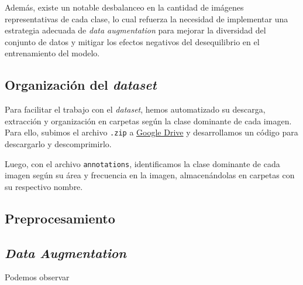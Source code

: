 \quad

\noindent
Además, existe un notable desbalanceo en la cantidad de imágenes representativas de cada clase, lo cual refuerza la necesidad de implementar una estrategia adecuada de 
\textit{data augmentation} para mejorar la diversidad del conjunto de datos y mitigar los efectos negativos del desequilibrio en el entrenamiento del modelo.

\subsection{Organización del \textit{dataset}}

\noindent
Para facilitar el trabajo con el \textit{dataset}, hemos automatizado su descarga, extracción y organización en carpetas según la clase dominante de
cada imagen. Para ello, subimos el archivo \texttt{.zip} a \href{https://drive.google.com/uc?id=1iGBv-VT5mm1RiouD-U2qWcU3BYqp2OwE}{Google Drive} y 
desarrollamos un código para descargarlo y descomprimirlo.  

\quad  

\noindent
Luego, con el archivo \texttt{annotations}, identificamos la clase dominante de cada imagen según su área y frecuencia en la imagen, almacenándolas
en carpetas con su respectivo nombre.  


\subsection{Preprocesamiento}

\noindent


\subsection{\textit{Data Augmentation}}

\noindent
Podemos observar 


